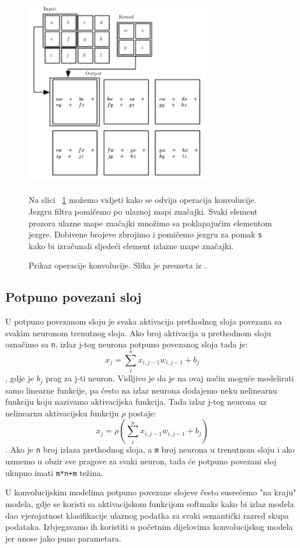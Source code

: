 \documentclass[times, utf8, diplomski,  numeric]{fer}
\begin{document}
\begin{figure}[htp]

\centering
\includegraphics[width=8cm]{./images/du-convolution}\hfill

\caption{Prikaz operacije konvolucije. Slika je preuzeta iz \cite{Goodfellow-et-al-2016}.}
\label{fig:convolution}
Na slici ~\ref{fig:convolution} možemo vidjeti kako se odvija operacija konvolucije. Jezgru filtra pomičemo po ulaznoj mapi značajki. Svaki element prozora ulazne mape značajki množimo sa poklapajućim elementom jezgre. Dobivene brojeve zbrojimo i pomičemo jezgru za pomak \verb|s| kako bi izračunali sljedeći element izlazne mape značajki.
\end{figure} 
\subsection{Potpuno povezani sloj}
U potpuno povezanom sloju je svaka aktivacija prethodnog sloja povezana sa svakim neuronom trenutnog sloja. Ako broj aktivacija u prethodnom sloju označimo sa \verb|n|, izlaz j-tog neurona potpuno povezanog sloja tada je:
\begin{equation}
x_{j} = \sum_{i}^{n} x_{i,j-1} w_{i,j-1} + b_{j} 
\end{equation},
gdje je $b_{j}$ prag za j-ti neuron. Vidljivo je da je na ovaj način moguće modelirati samo linearne funkcije, pa često na izlaz neurona dodajemo neku nelinearnu funkciju koju nazivamo aktivacijska funkcija. Tada izlaz j-tog neurona uz nelinearnu aktivacijsku funkciju $\rho$ postaje:
\begin{equation}
x_{j} = \rho(\sum_{i}^{n} x_{i,j-1} w_{i,j-1} + b_{j}) 
\end{equation}.
Ako je \verb|n| broj izlaza prethodnog sloja, a \verb|m| broj neurona u trenutnom sloju i ako uzmemo u obzir sve pragove za svaki neuron, tada će potpuno povezani sloj ukupno imati \verb|m*n+m| težina.
\par
U konvolucijskim modelima potpuno povezane slojeve često susrećemo "na kraju" modela, gdje se koristi sa aktivacijskom funkcijom softmaks kako bi izlaz modela dao vjerojatnost klasifikacije ulaznog podatka za svaki semantički razred skupa podataka. Izbjegavamo ih koristiti u početnim dijelovima konvolucijskog modela jer unose jako puno parametara.
\end{document}
